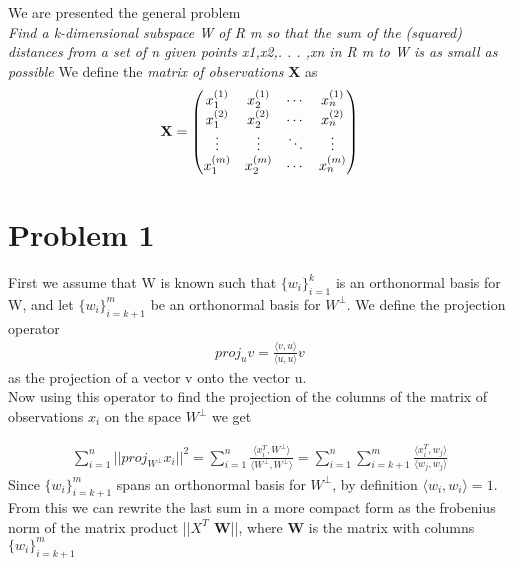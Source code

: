 \documentclass[a4paper,norsk]{article}
\begin{document}
\maketitle

We are presented the general problem \\
\textit{Find a k-dimensional subspace W of R m so that the sum of the (squared) distances from a set of n given points x1,x2,. . . ,xn in R m to W is as small as possible}
We define the \textit{matrix of observations} \textbf{X} as \\

\begin{align*}
	\text{\textbf{X}} = 
 \begin{pmatrix}
  x_{1}^{(1)} & x_{2}^{(1)} & \cdots & x_{n}^{(1)} \\
  x_{1}^{(2)} & x_{2}^{(2)} & \cdots & x_{n}^{(2)} \\
  \vdots  & \vdots  & \ddots & \vdots  \\
  x_{1}^{(m)} & x_{2}^{(m)} & \cdots & x_{n}^{(m)}
 \end{pmatrix}
\end{align*}

\section*{Problem 1}
First we assume that W is known such that $\{w_i\}_{i=1}^{k}$ is an orthonormal basis for W, and let $\{w_i\}_{i=k+1}^{m}$
be an orthonormal basis for $W^{\perp}$. We define the projection operator 
\begin{align*}
proj_u v = \frac{\langle v , u\rangle}{\langle u, u \rangle} v
\end{align*}
 as the projection of a vector v onto the vector u. \\
Now using this operator to find the projection of the columns of the matrix of observations $x_i$ on the space $W^\perp$ we get 

\begin{align*}
\sum_{i=1}^n ||proj_{W^\perp} x_i||^2 = \sum_{i=1}^n \frac{\langle x_i^T , W^\perp \rangle}{\langle W^\perp, W^\perp \rangle} = 
\sum_{i=1}^n \sum_{i=k+1}^m \frac{\langle x_i^T , w_j \rangle}{\langle w_j, w_j \rangle}
\end{align*}
Since $\{w_i\}_{i=k+1}^{m}$ spans an orthonormal basis for $W^\perp$, by definition $\langle w_i, w_i \rangle = 1$.
From this we can  rewrite the last sum in a more compact form 
as the frobenius norm of the matrix product ||\textbf{$X^T$ W}||, where \textbf{W} is 
the matrix with columns  $\{w_i\}_{i=k+1}^{m}$
\newpage
\end{document}
